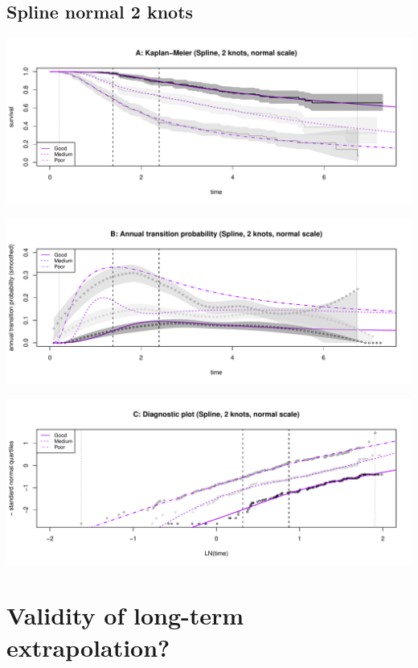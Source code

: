 \documentclass[]{article}
\begin{document}
\subsection{Spline normal 2 knots}\label{spline-normal-2-knots}

\begin{flushleft}\includegraphics[height=0.3\textheight]{Images/spline_norm2-1} \end{flushleft}

\begin{flushleft}\includegraphics[height=0.3\textheight]{Images/spline_norm2-2} \end{flushleft}

\begin{flushleft}\includegraphics[height=0.3\textheight]{Images/spline_norm2-3} \end{flushleft}

\newpage

\section{Validity of long-term
extrapolation?}\label{validity-of-long-term-extrapolation}
\end{document}

